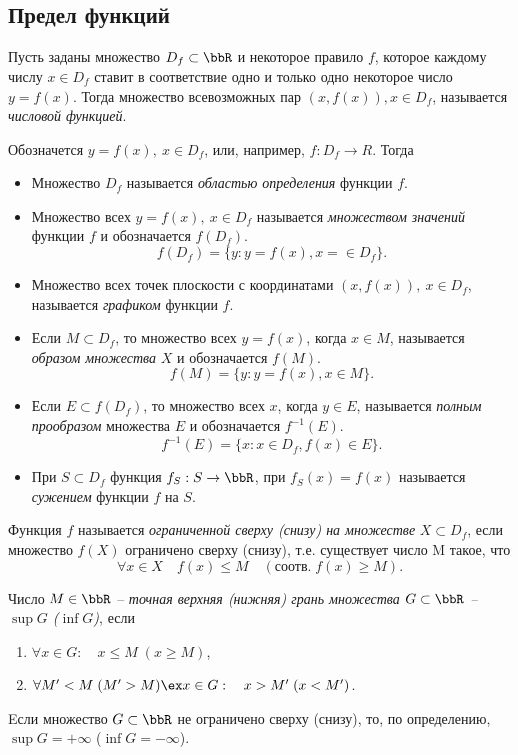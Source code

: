 \subsection{Предел функций}
\begin{defn}
Пусть заданы множество $D_f \subset \bbR$ и некоторое правило $f$, которое каждому числу $x\in D_f$ ставит в соответствие одно и только одно некоторое число $y=f(x)$. Тогда множество всевозможных пар $(x, f(x)), x\in D_f$, называется \textit{числовой функцией}.
\end{defn}

Обозначется $y=f(x),\ x\in D_f$, или, например, $f: D_f \to R$. Тогда
\begin{itemize}
\item
Множество $D_f$ называется \textit{областью определения} функции $f$.
\item
Множество всех $y=f(x),\ x\in D_f$ называется \textit{множеством значений} функции $f$ и обозначается $f(D_f)$. $$f(D_f)=\{y: y=f(x), x=\in D_f\}.$$
\item 
Множество всех точек плоскости с координатами $(x, f(x)),\ x\in D_f$, называется \textit{графиком} функции $f$.
\item
Если $M \subset D_f$, то множество всех $y=f(x)$, когда $x\in M$, называется \textit{образом множества} $X$ и обозначается $f(M)$. $$f(M) = \{y:y=f(x), x\in M\}.$$
\item
Если $E \subset f(D_f)$, то множество всех $x$, когда $y\in E$, называется \textit{полным прообразом} множества $E$ и обозначается $f^{-1}(E)$. $$f^{-1}(E)=\{x:x\in D_f, f(x)\in E\}.$$
\item
При $S\subset D_f$ функция $f_S: S\to\bbR$, при $f_S(x)=f(x)$ называется \textit{сужением} функции $f$ на $S$.
\end{itemize}
 
 
 
 
\begin{defn}
Функция $f$ называется \textit{ограниченной сверху (снизу) на множестве} $X\subset D_f$, если множество $f(X)$ ограничено сверху (снизу), т.е. существует число M такое, что
$$
\forall x \in X \quad f(x) \le M \quad (\text{соотв.}\; f(x)\ge M).
$$
\end{defn}

\begin{defn}
Число $M \in \bbR$ -- \textit{точная верхняя (нижняя) грань множества $G \subset \bbR$ -- $\sup G$ ($\inf G$)}, если 
\begin{enumerate}
\item
$\forall x \in G:\quad x \le M \;(x\ge M)$,
\item
$\forall M' < M \;(M' > M) \ex x\in G: \quad x>M' \;(x<M')$.
\end{enumerate}
\quad\textbullet\quad Eсли множество $G \subset \bbR$ не ограничено сверху (снизу), то, по определению, $\sup G=+\infty$ ($\inf G=-\infty$).  
\end{defn}

